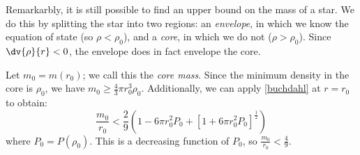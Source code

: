 \documentclass{jknotes}
\begin{document}
\begin{wrapfigure}{l}{0.5\linewidth}
    \centering
\end{wrapfigure}
Remarkarbly, it is still possible to find an upper bound on the mass of a star. We do this by splitting the star into two regions: an \emph{envelope}, in which we know the equation of state (so \(\rho<\rho_0\)), and a \emph{core}, in which we do not (\(\rho>\rho_0\)). Since \(\dv{\rho}{r}<0\), the envelope does in fact envelope the core.

Let \(m_0 = m(r_0)\); we call this the \emph{core mass}. Since the minimum density in the core is \(\rho_0\), we have \(m_0\ge\frac{4}{3}\pi r_0^3\rho_0\). Additionally, we can apply \eqref{buchdahl} at \(r=r_0\) to obtain:
\begin{equation}
    \frac{m_0}{r_0} < \frac{2}{9}\left( 1 - 6\pi r_0^2P_0 + \left[ 1 + 6\pi r_0^2P_0 \right]^{\frac{1}{2}} \right)
\end{equation}
where \(P_0=P(\rho_0)\). This is a decreasing function of \(P_0\), so \(\frac{m_0}{r_0}<\frac{4}{9}\).
\end{document}
